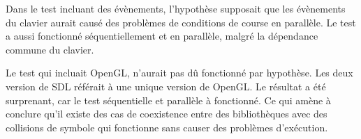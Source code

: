 Dans le test incluant des évènements, l'hypothèse supposait que les évènements du clavier
aurait causé des problèmes de conditions de course en parallèle. Le test a aussi fonctionné
séquentiellement et en parallèle, malgré la dépendance commune du clavier.

Le test qui incluait OpenGL, n'aurait pas dû fonctionné par hypothèse. Les deux version
de SDL référait à une unique version de OpenGL. Le résultat a été surprenant, car le test
séquentielle et parallèle à fonctionné. Ce qui amène à conclure qu'il existe des cas
de coexistence entre des bibliothèques avec des collisions de symbole qui fonctionne
sans causer des problèmes d'exécution.



%
%
%
